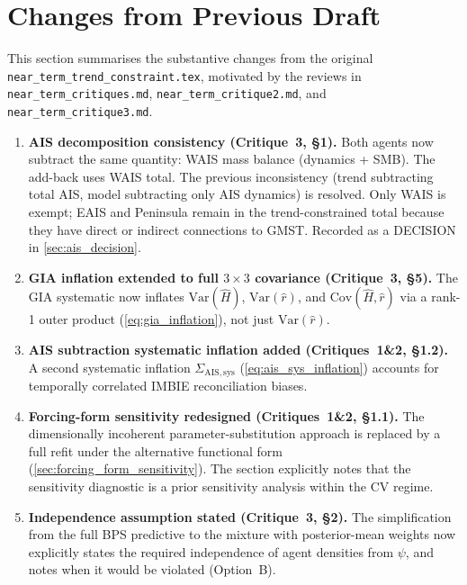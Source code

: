 \documentclass[11pt]{article}
\begin{document}
\section*{Changes from Previous Draft}

This section summarises the substantive changes from the original \texttt{near\_term\_trend\_constraint.tex}, motivated by the reviews in \texttt{near\_term\_critiques.md}, \texttt{near\_term\_critique2.md}, and \texttt{near\_term\_critique3.md}.

\begin{enumerate}
  \item \textbf{AIS decomposition consistency (Critique~3, \S1).}  Both agents now subtract the same quantity: WAIS mass balance (dynamics + SMB).  The add-back uses WAIS total.  The previous inconsistency (trend subtracting total AIS, model subtracting only AIS dynamics) is resolved.  Only WAIS is exempt; EAIS and Peninsula remain in the trend-constrained total because they have direct or indirect connections to GMST.  Recorded as a DECISION in \cref{sec:ais_decision}.

  \item \textbf{GIA inflation extended to full $3 \times 3$ covariance (Critique~3, \S5).}  The GIA systematic now inflates $\mathrm{Var}(\hat{H})$, $\mathrm{Var}(\hat{r})$, and $\mathrm{Cov}(\hat{H}, \hat{r})$ via a rank-1 outer product (\cref{eq:gia_inflation}), not just $\mathrm{Var}(\hat{r})$.

  \item \textbf{AIS subtraction systematic inflation added (Critiques~1\&2, \S1.2).}  A second systematic inflation $\Sigma_{\mathrm{AIS,sys}}$ (\cref{eq:ais_sys_inflation}) accounts for temporally correlated IMBIE reconciliation biases.

  \item \textbf{Forcing-form sensitivity redesigned (Critiques~1\&2, \S1.1).}  The dimensionally incoherent parameter-substitution approach is replaced by a full refit under the alternative functional form (\cref{sec:forcing_form_sensitivity}).  The section explicitly notes that the sensitivity diagnostic is a prior sensitivity analysis within the CV regime.

  \item \textbf{Independence assumption stated (Critique~3, \S2).}  The simplification from the full BPS predictive to the mixture with posterior-mean weights now explicitly states the required independence of agent densities from $\psi$, and notes when it would be violated (Option~B).


\end{enumerate}
\end{document}
